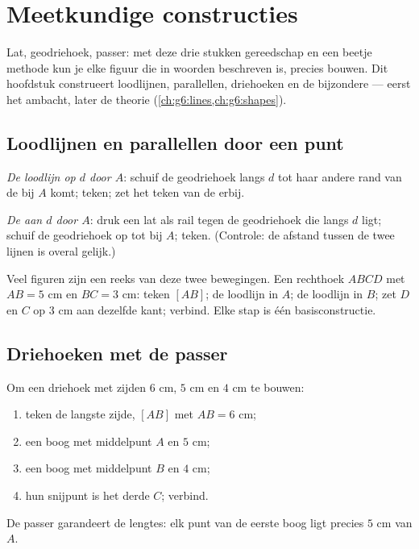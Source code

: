 \chapter{Meetkundige constructies}\label{ch:g5:geometry}

Lat, geodriehoek, passer: met deze drie stukken gereedschap en een beetje
methode kun je elke figuur die in woorden beschreven is, precies bouwen. Dit
hoofdstuk construeert loodlijnen, parallellen, driehoeken en de bijzondere
 --- eerst het ambacht, later de theorie
(\cref{ch:g6:lines,ch:g6:shapes}).

\section{Loodlijnen en parallellen door een punt}

\begin{method}\label{met:g5:geometry:basic}
\emph{De loodlijn op $d$ door $A$}: schuif de geodriehoek langs $d$ tot haar
andere rand van de  bij $A$ komt; teken; zet het teken van de
 erbij.

\emph{De  aan $d$ door $A$}: druk een lat als rail tegen de
geodriehoek die langs $d$ ligt; schuif de geodriehoek op tot bij $A$; teken.
(Controle: de afstand tussen de twee lijnen is overal gelijk.)
\end{method}

\begin{example}\label{ex:g5:geometry:chain}
Veel figuren zijn een reeks van deze twee bewegingen. Een rechthoek $ABCD$
met $AB = 5$ cm en $BC = 3$ cm: teken $[AB]$; de loodlijn in $A$; de loodlijn
in $B$; zet $D$ en $C$ op $3$ cm aan dezelfde kant; verbind. Elke stap is één
basisconstructie.
\end{example}

\section{Driehoeken met de passer}

\begin{method}\label{met:g5:geometry:triangle}
Om een driehoek met zijden $6$ cm, $5$ cm en $4$ cm te bouwen:
\begin{enumerate}
  \item teken de langste zijde, $[AB]$ met $AB = 6$ cm;
  \item een boog met middelpunt $A$ en  $5$ cm;
  \item een boog met middelpunt $B$ en  $4$ cm;
  \item hun snijpunt is het derde  $C$; verbind.
\end{enumerate}
De passer garandeert de lengtes: elk punt van de eerste boog ligt precies $5$
cm van $A$.
\end{method}

